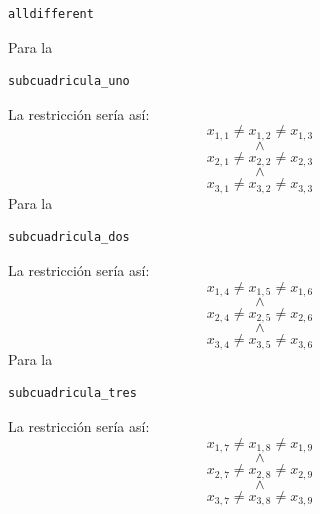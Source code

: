 \documentclass[12pt]{article}
\begin{document}
\begin{itemize}
\begin{itemize}
\begin{verbatim}
alldifferent
\end{verbatim}
Para la
\begin{verbatim}
subcuadricula_uno
\end{verbatim}
La restricción sería así:
\begin{equation*}
x_{1,1} \neq x_{1,2} \neq x_{1,3}
\end{equation*}
\begin{equation*}
\land
\end{equation*}
\begin{equation*}
x_{2,1} \neq x_{2,2} \neq x_{2,3}
\end{equation*}
\begin{equation*}
\land
\end{equation*}
\begin{equation*}
x_{3,1} \neq x_{3,2} \neq x_{3,3}
\end{equation*}
Para la
\begin{verbatim}
subcuadricula_dos
\end{verbatim}
La restricción sería así:
\begin{equation*}
x_{1,4} \neq x_{1,5} \neq x_{1,6}
\end{equation*}
\begin{equation*}
\land
\end{equation*}
\begin{equation*}
x_{2,4} \neq x_{2,5} \neq x_{2,6}
\end{equation*}
\begin{equation*}
\land
\end{equation*}
\begin{equation*}
x_{3,4} \neq x_{3,5} \neq x_{3,6}
\end{equation*}
Para la
\begin{verbatim}
subcuadricula_tres
\end{verbatim}
La restricción sería así:
\begin{equation*}
x_{1,7} \neq x_{1,8} \neq x_{1,9}
\end{equation*}
\begin{equation*}
\land
\end{equation*}
\begin{equation*}
x_{2,7} \neq x_{2,8} \neq x_{2,9}
\end{equation*}
\begin{equation*}
\land
\end{equation*}
\begin{equation*}
x_{3,7} \neq x_{3,8} \neq x_{3,9}
\end{equation*}

\end{itemize}
\end{itemize}
\end{document}
